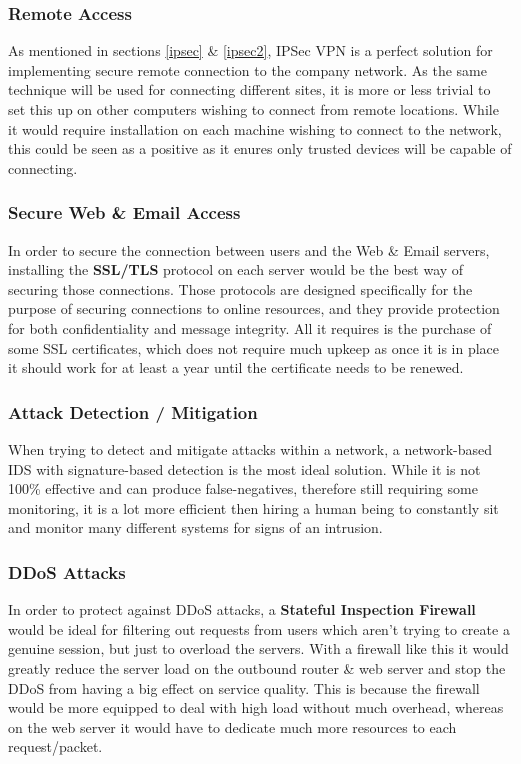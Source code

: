 \documentclass[11pt]{article}
\begin{document}
        \subsubsection{Remote Access}
          As mentioned in sections \ref{ipsec} \& \ref{ipsec2}, IPSec VPN is a perfect solution for implementing secure remote connection to the company network. As the same technique will be used for connecting different sites, it is more or less trivial to set this up on other computers wishing to connect from remote locations. While it would require installation on each machine wishing to connect to the network, this could be seen as a positive as it enures only trusted devices will be capable of connecting.

        \subsubsection{Secure Web \& Email Access}
          In order to secure the connection between users and the Web \& Email servers, installing the \textbf{SSL/TLS} protocol on each server would be the best way of securing those connections. Those protocols are designed specifically for the purpose of securing connections to online resources, and they provide protection for both confidentiality and message integrity. All it requires is the purchase of some SSL certificates, which does not require much upkeep as once it is in place it should work for at least a year until the certificate needs to be renewed.

        \subsubsection{Attack Detection / Mitigation}
          When trying to detect and mitigate attacks within a network, a network-based IDS with signature-based detection is the most ideal solution. While it is not 100\% effective and can produce false-negatives, therefore still requiring some monitoring, it is a lot more efficient then hiring a human being to constantly sit and monitor many different systems for signs of an intrusion.

        \subsubsection{DDoS Attacks}
          In order to protect against DDoS attacks, a \textbf{Stateful Inspection Firewall} would be ideal for filtering out requests from users which aren't trying to create a genuine session, but just to overload the servers. With a firewall like this it would greatly reduce the server load on the outbound router \& web server and stop the DDoS from having a big effect on service quality. This is because the firewall would be more equipped to deal with high load without much overhead, whereas on the web server it would have to dedicate much more resources to each request/packet.
\end{document}

